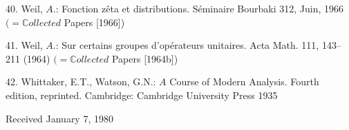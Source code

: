 \documentclass[11pt]{article}
\begin{document}
\par
40. Weil, \(A\).: Fonction zêta et distributions. Séminaire Bourbaki 312, Juin, 1966 \((=\mathbb{C}ollected\) Papers [1966])\par
\par
41. Weil, \(A\).: Sur certains groupes d’opérateurs unitaires. Acta Math. 111, 143--211 (1964) \((=\mathbb{C}ollected\) Papers [1964b])\par
\par
42. Whittaker, E.T., Watson, G.N.: \(A\) Course of Modern Analysis. Fourth edition, reprinted. Cambridge: Cambridge University Press 1935\par
\par
Received January 7, 1980\par
\end{document}
